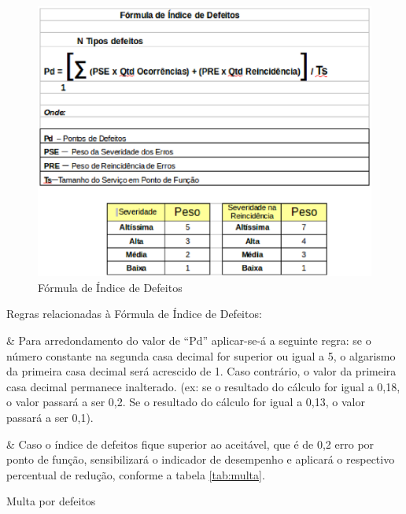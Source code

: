 \begin{figure}[h!]
\centering
\includegraphics[keepaspectratio=false,scale=0.5]{figuras/figuras_nilton/formula.eps}
\caption{Fórmula de Índice de Defeitos}
\label{formula}
\end{figure}

\begin{table}[!ht]
	\begin{center}


\begin{easylist}[itemize]

\begin{flushleft}
Regras relacionadas à Fórmula de Índice de Defeitos:\linebreak[1] 
\end{flushleft}


& Para arredondamento do valor de “Pd” aplicar-se-á a seguinte regra: se o número constante na segunda casa decimal for superior ou igual a 5, o algarismo da primeira casa decimal será acrescido de 1. Caso contrário, o valor da primeira casa decimal permanece inalterado. (ex: se o resultado do cálculo for igual a 0,18, o valor passará a ser 0,2. Se o resultado do cálculo for igual a 0,13, o valor passará a ser 0,1).

& Caso o índice de defeitos fique superior ao aceitável, que é de 0,2 erro por ponto de função, sensibilizará o indicador de desempenho e aplicará o respectivo percentual de redução, conforme a tabela \ref{tab:multa}.\linebreak[1]  
 
\end{easylist}
	
	 
	\caption{Multa por defeitos}
	\label{tab:multa}
	\end{center}
	\end{table}	
	\FloatBarrier
	
